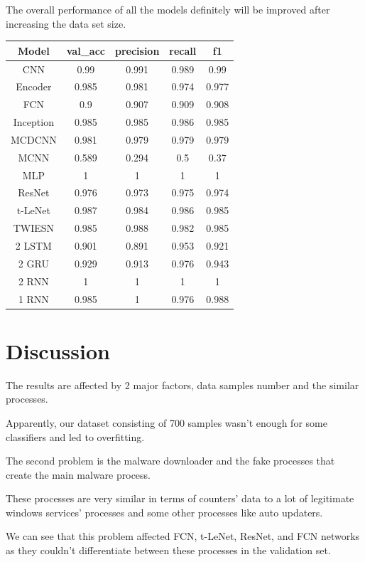 \documentclass[conference]{IEEEtran}
\begin{document}
The overall performance of all the models definitely will be improved after increasing the data set size.
\begin{center}
\begin{tabular}{||c c c c c||} 
 \hline
 Model & val\_acc & precision & recall & f1 \\ [0.5ex] 
 \hline\hline
 CNN & 0.99 & 0.991 & 0.989 & 0.99 \\ 
 \hline
 Encoder & 0.985 & 0.981 & 0.974 & 0.977 \\
 \hline
 FCN & 0.9 & 0.907 & 0.909 & 0.908 \\
 \hline
 Inception & 0.985 & 0.985 & 0.986 & 0.985 \\
 \hline
 MCDCNN & 0.981 & 0.979 & 0.979 & 0.979 \\ 
 \hline
 MCNN & 0.589 & 0.294 & 0.5 & 0.37 \\ 
 \hline
 MLP & 1 & 1 & 1 & 1 \\
 \hline
 ResNet & 0.976 & 0.973 & 0.975 & 0.974 \\
 \hline
 t-LeNet & 0.987 & 0.984 & 0.986 & 0.985 \\
 \hline
 TWIESN & 0.985 & 0.988 & 0.982 & 0.985 \\ 
 \hline
  2 LSTM & 0.901 & 0.891 & 0.953 & 0.921 \\
 \hline
 2 GRU & 0.929 & 0.913 & 0.976 & 0.943 \\
 \hline
 2 RNN & 1 & 1 & 1 & 1 \\
 \hline
 1 RNN & 0.985 & 1 & 0.976 & 0.988 \\ 
 \hline
\end{tabular}
\end{center}

\section{Discussion}
\label{sec:discussion}
The results are affected by 2 major factors, data samples number and the similar processes. 

Apparently, our dataset consisting of 700 samples wasn't enough for some classifiers and led to overfitting. 

The second problem is the malware downloader and the fake processes that create the main malware process. 

These processes are very similar in terms of counters' data to a lot of legitimate windows services' processes and some other processes like auto updaters. 

We can see that this problem affected FCN, t-LeNet, ResNet, and FCN networks as they couldn't differentiate between these processes in the validation set. 
\end{document}
